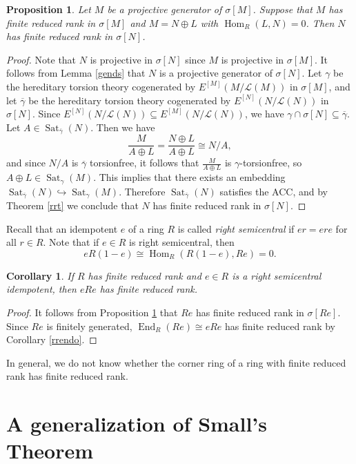 \documentclass{amsart}
\newtheorem{prop}[thm]{Proposition}
\newtheorem{cor}[thm]{Corollary}
\theoremstyle{definition}
\theoremstyle{remark}
\numberwithin{equation}{section}
\DeclareMathOperator{\Hom}{Hom}
\DeclareMathOperator{\End}{End}
\DeclareMathOperator{\Sat}{Sat}
\newcommand{\sm}{\sigma[M]}
\begin{document}
\begin{prop}\label{rrds}
	Let $M$ be a projective generator of $\sm$. 
	Suppose that $M$ has finite reduced rank in $\sm$ and 
	$M=N\oplus L$ with $\Hom_R(L,N)=0$. 
	Then $N$ has finite reduced rank in $\sigma[N]$.
\end{prop}

\begin{proof}
	Note that $N$ is projective in $\sigma[N]$ 
	since $M$ is projective in $\sm$. 
	It follows from Lemma \ref{gends} 
	that $N$ is a projective generator of $\sigma[N]$. 
	Let $\gamma$ be the hereditary torsion theory 
	cogenerated by $E^{[M]}(M/\mathcal{L}(M))$ in $\sm$,
	and let $\overline{\gamma}$ be the hereditary torsion theory 
	cogenerated by $E^{[N]}(N/\mathcal{L}(N))$ in $\sigma[N]$. 
	Since $E^{[N]}(N/\mathcal{L}(N))\subseteq E^{[M]}(N/\mathcal{L}(N))$, 
	we have $\gamma\cap\sigma[N]\subseteq\overline{\gamma}$. 
	Let $A\in \Sat_{\overline{\gamma}}(N)$. 
	Then we have
	\[\frac{M}{A\oplus L}=\frac{N\oplus L}{A\oplus L}\cong N/A,\]
	and since $N/A$ is $\overline{\gamma}$ torsionfree, 
	it follows that $\frac{M}{A\oplus L}$ is $\gamma$-torsionfree, 
	so $A\oplus L\in\Sat_\gamma(M)$. 
	This implies that there exists an embedding 
	$\Sat_{\overline{\gamma}}(N)\hookrightarrow\Sat_\gamma(M)$. 
	Therefore $\Sat_{\overline{\gamma}}(N)$ satisfies the ACC,
	and by Theorem \ref{rrt} we conclude that 
	$N$ has finite reduced rank in $\sigma[N]$.
\end{proof}

Recall that an idempotent $e$ of a ring $R$ 
is called \emph{right semicentral} 
if $er=ere$ for all $r\in R$. 
Note that if $e\in R$ is right semicentral, then 
\[eR(1-e)\cong\Hom_R(R(1-e),Re)=0 .\]

\begin{cor}\label{corner}
	If $R$ has finite reduced rank 
	and $e\in R$ is a right semicentral idempotent, 
	then $eRe$ has finite reduced rank.
\end{cor}

\begin{proof}
	It follows from Proposition \ref{rrds} 
	that $Re$ has finite reduced rank in $\sigma[Re]$. 
	Since $Re$ is finitely generated, 
	$\End_R(Re)\cong eRe$ has finite reduced rank by Corollary \ref{rrendo}.
\end{proof}

In general, we do not know whether 
the corner ring of a ring with finite reduced rank has finite reduced rank. 

\section{A generalization of Small's Theorem}
\label{gST}
\end{document}
